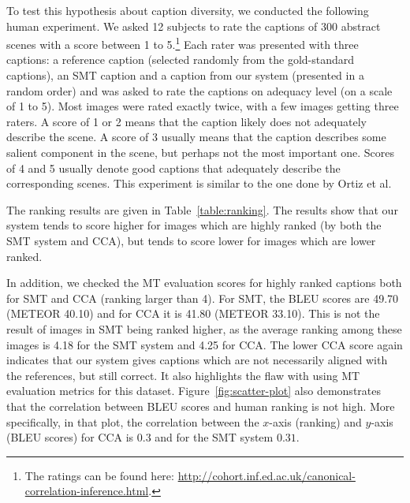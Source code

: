 \documentclass[letterpaper]{article}
\begin{document}
To test this hypothesis about caption diversity, we conducted the following human experiment. We asked 12 subjects to rate the captions of 300 abstract scenes with a score between 1 to
5.\footnote{The ratings can be found here: \url{http://cohort.inf.ed.ac.uk/canonical-correlation-inference.html}.} Each rater was presented with
three captions: a reference caption (selected randomly from the gold-standard captions), an SMT caption and a caption from our system (presented in a random order) 
and was asked to rate the captions on adequacy level (on a scale of 1 to 5). Most images
were rated exactly twice, with a few images getting three raters.
A score of 1 or 2 means that the caption likely does not adequately describe the scene. A score of 3 usually means
that the caption describes some salient component in the scene, but perhaps not the most important one. Scores of 4 and 5 usually denote good captions that adequately describe the corresponding scenes.
This experiment is similar to the one done by Ortiz et al.

The ranking results are given in Table~\ref{table:ranking}. The results show that our system tends to score higher for images which are highly ranked (by both the SMT system and CCA),
but tends to score lower for images which are lower ranked.

In addition, we checked the MT evaluation scores for highly ranked captions both for SMT and CCA (ranking larger than 4). For SMT, the BLEU scores are
49.70 (METEOR 40.10) and for CCA it is 41.80 (METEOR 33.10). This is not the result of images in SMT being ranked higher, as the average ranking
among these images is 4.18 for the SMT system and 4.25 for CCA. The lower CCA score again indicates that our system gives captions which are not necessarily aligned
with the references, but still correct. It also highlights the flaw with using MT evaluation metrics for this dataset. Figure~\ref{fig:scatter-plot} also demonstrates
that the correlation between BLEU scores and human ranking is not high. More specifically, in that plot, the correlation between the $x$-axis (ranking) and $y$-axis (BLEU
scores) for CCA is $0.3$ and for the SMT system $0.31$.



\end{document}
